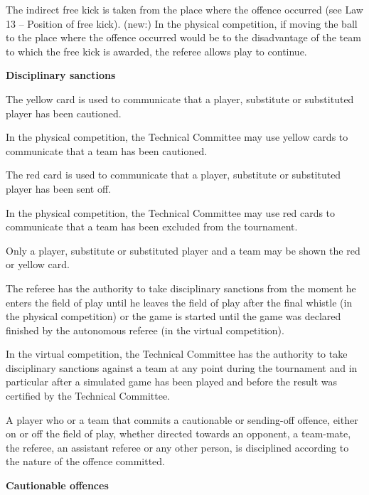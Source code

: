   \bigskip


The indirect free kick is taken from the place where the offence occurred (see Law 13 -- Position of free kick).
(new:) In the physical competition, if moving the ball to the place where the offence occurred would be to the disadvantage of the team to which the free kick is awarded, the referee allows play to continue.

\bigskip

{\bfseries Disciplinary sanctions}

\headlinebox

The yellow card is used to communicate that a player, substitute or substituted player has been cautioned.

In the physical competition, the Technical Committee may use yellow cards to communicate that a team has been cautioned.

\bigskip

The red card is used to communicate that a player, substitute or substituted player has been sent off.

In the physical competition, the Technical Committee may use red cards to communicate that a team has been excluded from the tournament.

\bigskip

Only a player, substitute or substituted player and a team may be shown the red or yellow card.

\bigskip

The referee has the authority to take disciplinary sanctions from the moment he enters the field of play until he leaves the field of play after the final whistle (in the physical competition)
or the game is started until the game was declared finished by the autonomous referee (in the virtual competition).

In the virtual competition, the Technical Committee has the authority to take disciplinary sanctions against a team at any point during the tournament and in particular after a simulated game has been played and before the result was certified by the Technical Committee.

\bigskip

A player who or a team that commits a cautionable or sending-off offence, either on or off the field of play, whether directed towards an opponent, a team-mate, the referee, an assistant referee or any other person, is disciplined according to the nature of the offence committed.

\bigskip

{\bfseries Cautionable offences }

